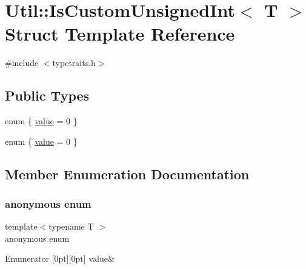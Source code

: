 \hypertarget{structUtil_1_1IsCustomUnsignedInt}{}\section{Util\+:\+:Is\+Custom\+Unsigned\+Int$<$ T $>$ Struct Template Reference}
\label{structUtil_1_1IsCustomUnsignedInt}


{\ttfamily \#include $<$typetraits.\+h$>$}

\subsection*{Public Types}
\begin{DoxyCompactItemize}
\item 
enum \{ \mbox{\hyperlink{structUtil_1_1IsCustomUnsignedInt_a3a80eb6cb413962b284849b094b83580a875066dceb0ae7eba8880348789640d7}{value}} = 0
 \}
\item 
enum \{ \mbox{\hyperlink{structUtil_1_1IsCustomUnsignedInt_a3a80eb6cb413962b284849b094b83580a875066dceb0ae7eba8880348789640d7}{value}} = 0
 \}
\end{DoxyCompactItemize}


\subsection{Member Enumeration Documentation}
\mbox{\label{structUtil_1_1IsCustomUnsignedInt_ab981b43b20e696e46a1400bc11a8e396}} 
\subsubsection{\texorpdfstring{anonymous enum}{anonymous enum}}
{\footnotesize\ttfamily template$<$typename T $>$ \\
anonymous enum}

\begin{DoxyEnumFields}{Enumerator}
[0pt][0pt]{}\mbox{\label{structUtil_1_1IsCustomUnsignedInt_a3a80eb6cb413962b284849b094b83580a875066dceb0ae7eba8880348789640d7}} 
value&\\
\hline

\end{DoxyEnumFields}
\mbox{\label{structUtil_1_1IsCustomUnsignedInt_a3a80eb6cb413962b284849b094b83580}} 
